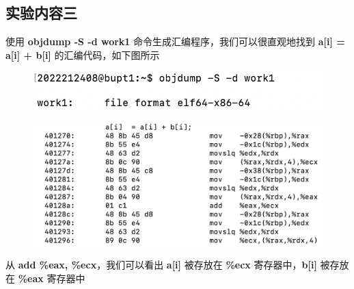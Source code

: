 \documentclass[UTF8, 12pt, a4paper, oneside]{ctexart}
\begin{document}
        \subsection{实验内容三}
            \par 使用 \textbf{objdump -S -d work1} 命令生成汇编程序，我们可以很直观地找到 \textbf{a[i] = a[i] + b[i]} 的汇编代码，如下图所示
            \begin{figure}[htbp]
                \includegraphics*[width = 12cm]{3.1.png}
            \end{figure}
            \begin{figure}[htbp]
                \includegraphics*[width = 14cm]{3.2.png}
            \end{figure}
            \par 从 \textbf{add \%eax, \%ecx}，我们可以看出 \textbf{a[i]} 被存放在 \textbf{\%ecx} 寄存器中，\textbf{b[i]} 被存放在 \textbf{\%eax} 寄存器中
        
\end{document}
